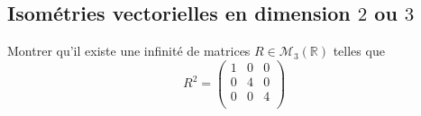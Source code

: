 \documentclass[a4paper,twoside,french,11pt]{VcCours}
\begin{document}




\subsection{Isométries vectorielles en dimension \texorpdfstring{$2$ ou $3$}{2 ou 3}}


\begin{Exercice}{} Montrer qu'il existe une infinité de matrices $R \in \mathcal{M}_3(\mathbb{R})$ telles que
$$  R^2 = \begin{pmatrix}
1 & 0 & 0 \\
0 & 4 & 0 \\
0 & 0 & 4 \\
\end{pmatrix}$$
\end{Exercice}

\end{document}
